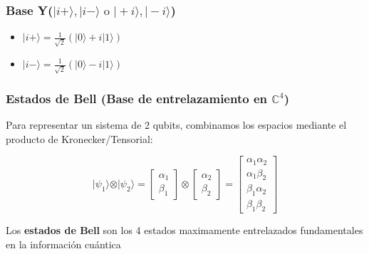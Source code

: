 \documentclass[11pt]{article}
\providecommand{\tightlist}{%
      \setlength{\itemsep}{0pt}\setlength{\parskip}{0pt}}
\begin{document}
\subsubsection{\texorpdfstring{\textbf{Base
Y(\(\vert{i}+\rangle,\vert{i}-\rangle \text{ o } \vert{}+i\rangle, \vert{}-i\rangle\))}}{Base Y(\textbackslash vert\{i\}+\textbackslash rangle,\textbackslash vert\{i\}-\textbackslash rangle \textbackslash text\{ o \} \textbackslash vert\{\}+i\textbackslash rangle, \textbackslash vert\{\}-i\textbackslash rangle)}}\label{base-yvertirangleverti-rangle-text-o-vertirangle-vert-irangle}

\begin{itemize}
\tightlist
\item
  \(\vert{i}+\rangle = \frac{1}{\sqrt{2}}(\vert{0}\rangle + i\vert{1}\rangle)\)
\item
  \(\vert{i}-\rangle = \frac{1}{\sqrt{2}}(\vert{0}\rangle - i\vert{1}\rangle)\)
\end{itemize}

\subsubsection{\texorpdfstring{\textbf{Estados de Bell (Base de
entrelazamiento en
\(\mathbb{C}^4\))}}{Estados de Bell (Base de entrelazamiento en \textbackslash mathbb\{C\}\^{}4)}}\label{estados-de-bell-base-de-entrelazamiento-en-mathbbc4}

Para representar un sistema de 2 qubits, combinamos los espacios
mediante el producto de Kronecker/Tensorial:

\[\vert\psi_1\rangle \otimes \vert\psi_2\rangle = \begin{bmatrix} \alpha_1 \\ \beta_1 \end{bmatrix} \otimes \begin{bmatrix} \alpha_2 \\ \beta_2 \end{bmatrix} = \begin{bmatrix} \alpha_1 \alpha_2 \\ \alpha_1 \beta_2 \\ \beta_1 \alpha_2 \\ \beta_1 \beta_2 \end{bmatrix}\]

Los \textbf{estados de Bell} son los 4 estados maximamente entrelazados
fundamentales en la información cuántica
\end{document}
